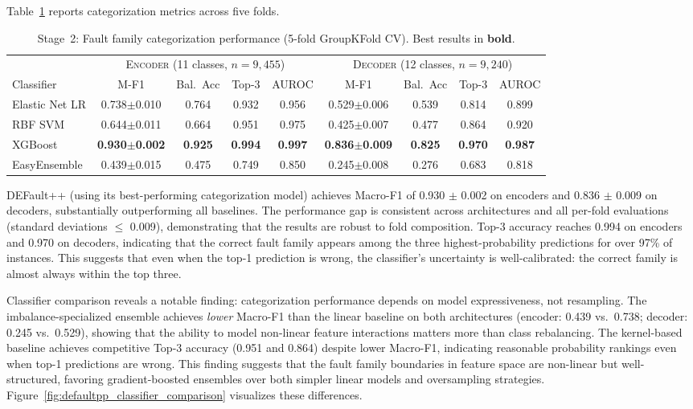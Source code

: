 Table~\ref{tab:categorization} reports categorization metrics across five folds.

\begin{table}[!ht]
\centering
\caption{Stage~2: Fault family categorization performance (5-fold GroupKFold CV). Best results in \textbf{bold}.}
\label{tab:categorization}
\small
\setlength{\tabcolsep}{3.5pt}
\begin{tabular}{l cccc cccc}
\toprule
& \multicolumn{4}{c}{\textsc{Encoder} (11 classes, $n\!=\!9{,}455$)} & \multicolumn{4}{c}{\textsc{Decoder} (12 classes, $n\!=\!9{,}240$)} \\
\cmidrule(lr){2-5}\cmidrule(lr){6-9}
Classifier & M-F1 & Bal.\ Acc & Top-3 & AUROC & M-F1 & Bal.\ Acc & Top-3 & AUROC \\
\midrule
Elastic Net LR & 0.738$\pm$0.010 & 0.764 & 0.932 & 0.956 & 0.529$\pm$0.006 & 0.539 & 0.814 & 0.899 \\
RBF SVM & 0.644$\pm$0.011 & 0.664 & 0.951 & 0.975 & 0.425$\pm$0.007 & 0.477 & 0.864 & 0.920 \\
XGBoost & \textbf{0.930$\pm$0.002} & \textbf{0.925} & \textbf{0.994} & \textbf{0.997} & \textbf{0.836$\pm$0.009} & \textbf{0.825} & \textbf{0.970} & \textbf{0.987} \\
EasyEnsemble & 0.439$\pm$0.015 & 0.475 & 0.749 & 0.850 & 0.245$\pm$0.008 & 0.276 & 0.683 & 0.818 \\
\bottomrule
\end{tabular}
\end{table}

DEFault++ (using its best-performing categorization model) achieves Macro-F1 of 0.930 $\pm$ 0.002 on encoders and 0.836 $\pm$ 0.009 on decoders, substantially outperforming all baselines. The performance gap is consistent across architectures and all per-fold evaluations (standard deviations $\leq$ 0.009), demonstrating that the results are robust to fold composition. Top-3 accuracy reaches 0.994 on encoders and 0.970 on decoders, indicating that the correct fault family appears among the three highest-probability predictions for over 97\% of instances. This suggests that even when the top-1 prediction is wrong, the classifier's uncertainty is well-calibrated: the correct family is almost always within the top three.

Classifier comparison reveals a notable finding: categorization performance depends on model expressiveness, not resampling. The imbalance-specialized ensemble achieves \emph{lower} Macro-F1 than the linear baseline on both architectures (encoder: 0.439 vs.\ 0.738; decoder: 0.245 vs.\ 0.529), showing that the ability to model non-linear feature interactions matters more than class rebalancing. The kernel-based baseline achieves competitive Top-3 accuracy (0.951 and 0.864) despite lower Macro-F1, indicating reasonable probability rankings even when top-1 predictions are wrong. This finding suggests that the fault family boundaries in feature space are non-linear but well-structured, favoring gradient-boosted ensembles over both simpler linear models and oversampling strategies. Figure~\ref{fig:defaultpp_classifier_comparison} visualizes these differences.

